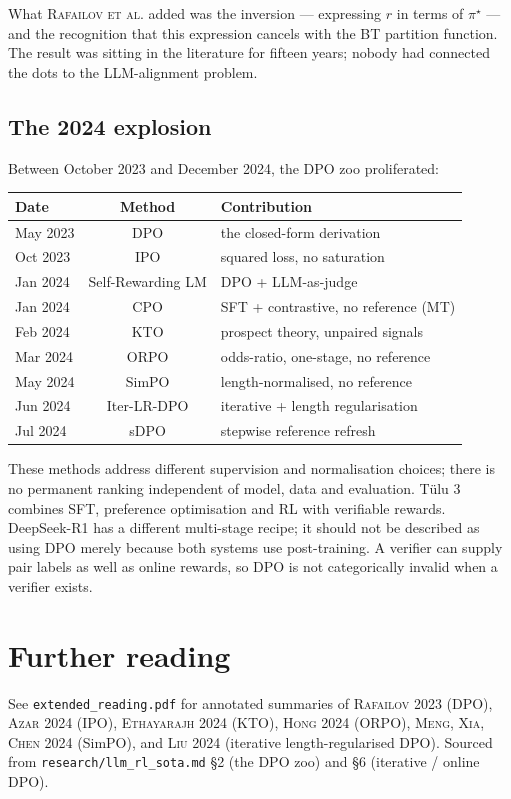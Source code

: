 \documentclass[11pt,oneside]{scrbook}
\begin{document}
What \textsc{Rafailov et al.} added was the inversion --- expressing
$r$ in terms of $\pi^\star$ --- and the recognition that this
expression cancels with the BT partition function. The result was
sitting in the literature for fifteen years; nobody had connected
the dots to the LLM-alignment problem.

\section{The 2024 explosion}

Between October 2023 and December 2024, the DPO zoo proliferated:

\begin{center}
\small
\begin{tabular}{lcl}
\toprule
Date & Method & Contribution \\
\midrule
May 2023 & DPO    & the closed-form derivation \\
Oct 2023 & IPO    & squared loss, no saturation \\
Jan 2024 & Self-Rewarding LM & DPO + LLM-as-judge \\
Jan 2024 & CPO    & SFT + contrastive, no reference (MT) \\
Feb 2024 & KTO    & prospect theory, unpaired signals \\
Mar 2024 & ORPO   & odds-ratio, one-stage, no reference \\
May 2024 & SimPO  & length-normalised, no reference \\
Jun 2024 & Iter-LR-DPO & iterative + length regularisation \\
Jul 2024 & sDPO   & stepwise reference refresh \\
\bottomrule
\end{tabular}
\end{center}

These methods address different supervision and normalisation choices;
there is no permanent ranking independent of model, data and evaluation.
T\"ulu 3 combines SFT, preference optimisation and RL with verifiable rewards.
DeepSeek-R1 has a different multi-stage recipe; it should not be described
as using DPO merely because both systems use post-training. A verifier can
supply pair labels as well as online rewards, so DPO is not categorically
invalid when a verifier exists.

\chapter{Further reading}

See \texttt{extended\_reading.pdf} for annotated summaries of
\textsc{Rafailov 2023} (DPO), \textsc{Azar 2024} (IPO),
\textsc{Ethayarajh 2024} (KTO), \textsc{Hong 2024} (ORPO),
\textsc{Meng, Xia, Chen 2024} (SimPO), and \textsc{Liu 2024}
(iterative length-regularised DPO). Sourced from
\texttt{research/llm\_rl\_sota.md} §2 (the DPO zoo) and §6
(iterative / online DPO).
\end{document}
